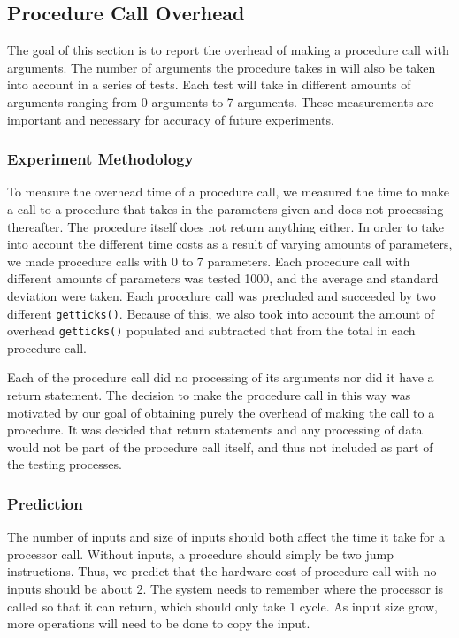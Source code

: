 \documentclass{article} %
\begin{document}
\subsection{Procedure Call Overhead}
The goal of this section is to report the overhead of making a procedure call
with arguments. The number of arguments the procedure takes in will also be
taken into account in a series of tests. Each test will take in different
amounts of arguments ranging from 0 arguments to 7 arguments. These
measurements are important and necessary for accuracy of future experiments.

\subsubsection{Experiment Methodology}
To measure the overhead time of a procedure call, we measured the time to make
a call to a procedure that takes in the parameters given and does not
processing thereafter. The procedure itself does not return anything either.
In order to take into account the different time costs as a result of varying
amounts of parameters, we made procedure calls with 0 to 7 parameters. Each
procedure call with different amounts of parameters was tested 1000, and the
average and standard deviation were taken. Each procedure call was precluded
and succeeded by two different \texttt{getticks()}. Because of this, we also
took into account the amount of overhead \texttt{getticks()} populated and
subtracted that from the total in each procedure call.

Each of the procedure call did no processing of its arguments nor did it have
a return statement. The decision to make the procedure call in this way was
motivated by our goal of obtaining purely the overhead of making the call to
a procedure. It was decided that return statements and any processing of data
would not be part of the procedure call itself, and thus not included as part
of the testing processes.

\subsubsection{Prediction}
The number of inputs and size of inputs should both affect the time it
take for a processor call. Without inputs, a procedure should simply be two
jump instructions. Thus, we predict that the hardware cost of procedure call
with no inputs should be about 2. The system needs to remember where the
processor is called so that it can return, which should only take 1 cycle. As
input size grow, more operations will need to be done to copy the
input.
\end{document}

